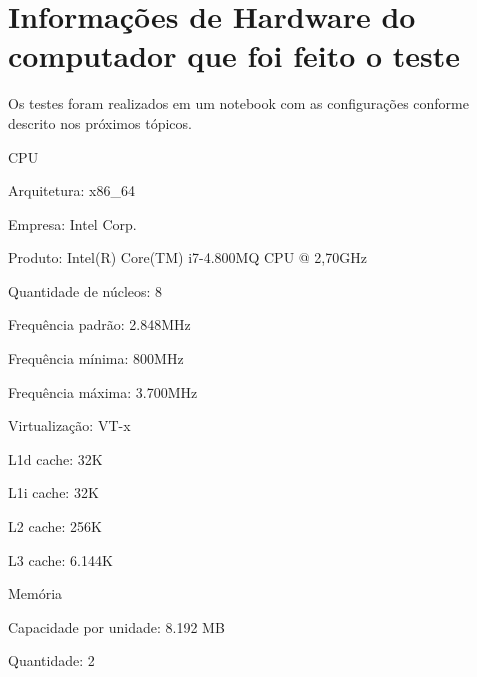 \section{Informações de Hardware do computador que foi feito o teste}

Os testes foram realizados em um notebook com as configurações conforme
descrito nos próximos tópicos.

\begin{alineas}

  \item CPU

  \begin{alineas}

     \item Arquitetura: x86\_64

     \item Empresa: Intel Corp.

     \item Produto: Intel(R) Core(TM) i7-4.800MQ CPU @ 2,70GHz

     \item Quantidade de núcleos: 8

     \item Frequência padrão: 2.848MHz

     \item Frequência mínima:  800MHz

     \item Frequência máxima: 3.700MHz

     \item Virtualização: VT-x

     \item L1d cache: 32K

     \item L1i cache: 32K

     \item L2 cache: 256K

     \item L3 cache: 6.144K

  \end{alineas}

  \item Memória

  \begin{alineas}

     \item Capacidade por unidade: 8.192 MB

     \item Quantidade: 2


\end{alineas}
\end{alineas}
